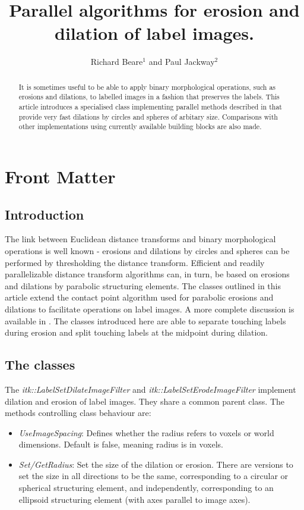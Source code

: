 \documentclass{InsightArticle}
\title{Parallel algorithms for erosion and dilation of label images.}
\author{Richard Beare{$^1$} {\small and} Paul Jackway{$^2$}}
\newcommand{\IJhandlerIDnumber}{3399}
\begin{document}
\IJhandlefooter{\IJhandlerIDnumber}

\maketitle

\ifhtml
\chapter*{Front Matter\label{front}}
\fi


\begin{abstract}
\noindent
It is sometimes useful to be able to apply binary morphological
operations, such as erosions and dilations, to labelled images in a
fashion that preserves the labels. This article introduces a
specialised class implementing parallel methods described in
\cite{beare2011parallel} that provide very fast dilations by circles
and spheres of arbitary size. Comparisons with other implementations
using currently available building blocks are also made.
\end{abstract}
\IJhandlenote{\IJhandlerIDnumber}
\tableofcontents

\section{Introduction}
The link between Euclidean distance transforms and binary
morphological operations is well known - erosions and dilations by
circles and spheres can be performed by thresholding the distance
transform. Efficient and readily parallelizable distance transform
algorithms can, in turn, be based on erosions and dilations by
parabolic structuring elements. The classes outlined in this article
extend the contact point algorithm used for parabolic erosions and
dilations to facilitate operations on label images. A more complete
discussion is available in \cite{beare2011parallel}. The classes
introduced here are able to separate touching labels during erosion
and split touching labels at the midpoint during dilation.

\section{The classes}
The {\em itk::LabelSetDilateImageFilter} and {\em
  itk::LabelSetErodeImageFilter} implement dilation and erosion of
label images. They share a common parent class. The methods controlling class behaviour are:
\begin{itemize}
\item {\em UseImageSpacing}: Defines whether the radius refers to voxels or world dimensions. Default is false, meaning radius is in voxels.
\item {\em Set/GetRadius}: Set the size of the dilation or erosion. There are versions to set the size in all directions to be the same, corresponding to a circular or spherical structuring element, and independently, corresponding to an ellipsoid structuring element (with axes parallel to image axes).
\end{itemize}
\end{document}
